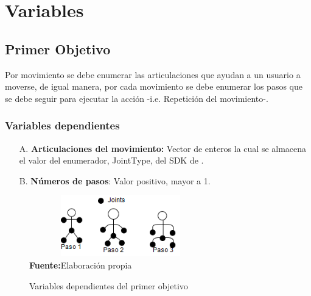 \section{Variables} \label{vr}
\subsection{Primer Objetivo} \label{vr:1o}
Por movimiento se debe enumerar las articulaciones que ayudan a un usuario a moverse, de igual manera, por cada movimiento se debe enumerar los pasos que se debe seguir para ejecutar la acci\'on -i.e. Repetici\'on del movimiento-.
\subsubsection{Variables dependientes} \label{vr:1o:dep}
\begin{enumerate}
	\item[A.] \textbf{Articulaciones del movimiento:}  Vector de enteros la cual se almacena el valor del enumerador, JointType, del SDK de  .
	\item[B.] \textbf{N\'umeros de pasos}: Valor positivo, mayor a 1.
\end{enumerate}
	\begin{figure}[H]
	\caption{Variables dependientes del primer objetivo}
	\label{fig:vardep1}
	\centering
	\includegraphics[width=300px,height=100px]{graphics/var-1obj.png} \\
	\textbf{Fuente:}Elaboraci\'on propia 
\end{figure}
\medbreak
